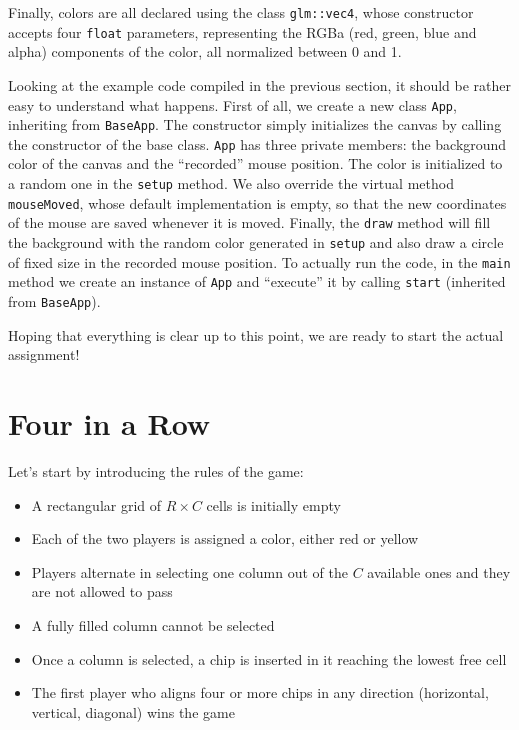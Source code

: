 \documentclass{article}
\begin{document}
Finally, colors are all declared using the class \texttt{glm::vec4}, whose constructor accepts four \texttt{float} parameters, representing the RGBa (red, green, blue and alpha) components of the color, all normalized between 0 and 1.

Looking at the example code compiled in the previous section, it should be rather easy to understand what happens. First of all, we create a new class \texttt{App}, inheriting from \texttt{BaseApp}. The constructor simply initializes the canvas by calling the constructor of the base class. \texttt{App} has three private members: the background color of the canvas and the ``recorded'' mouse position. The color is initialized to a random one in the \texttt{setup} method. We also override the virtual method \texttt{mouseMoved}, whose default implementation is empty, so that the new coordinates of the mouse are saved whenever it is moved. Finally, the \texttt{draw} method will fill the background with the random color generated in \texttt{setup} and also draw a circle of fixed size in the recorded mouse position. To actually run the code, in the \texttt{main} method we create an instance of \texttt{App} and ``execute'' it by calling \texttt{start} (inherited from \texttt{BaseApp}).

Hoping that everything is clear up to this point, we are ready to start the actual assignment!



\section{Four in a Row}

Let's start by introducing the rules of the game:
\begin{itemize}
  \item A rectangular grid of $R\times C$ cells is initially empty
  \item Each of the two players is assigned a color, either red or yellow
  \item Players alternate in selecting one column out of the $C$ available ones and they are not allowed to pass
  \item A fully filled column cannot be selected
  \item Once a column is selected, a chip is inserted in it reaching the lowest free cell
  \item The first player who aligns four or more chips in any direction (horizontal, vertical, diagonal) wins the game
\end{itemize}
\end{document}
